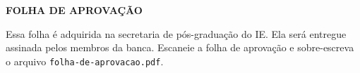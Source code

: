 \begin{center}
  {\Large \textbf{FOLHA DE APROVAÇÃO}
  }
\end{center}

Essa folha é adquirida na secretaria de pós-graduação do IE. Ela será
entregue assinada pelos membros da banca. Escaneie a folha de aprovação e
sobre-escreva o arquivo \verb+folha-de-aprovacao.pdf+.